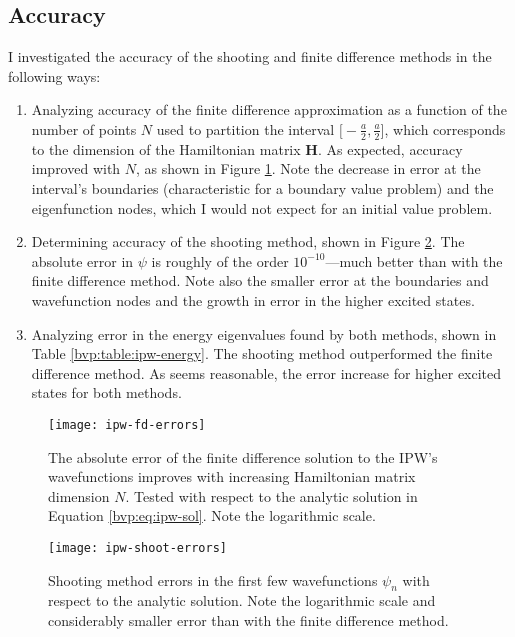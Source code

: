 \documentclass[11pt, a4paper]{article}
\begin{document}
\subsection{Accuracy}
I investigated the accuracy of the shooting and finite difference methods in the following ways:
\begin{enumerate}
	\item Analyzing accuracy of the finite difference approximation as a function of the number of points $ N $ used to partition the interval $ \big[-\frac{a}{2}, \frac{a}{2}\big] $, which corresponds to the dimension of the Hamiltonian matrix $ \mathbf{H} $. As expected, accuracy improved with $ N $, as shown in Figure \ref{bvp:fig:ipw-fd-errors}. Note the decrease in error at the interval's boundaries (characteristic for a boundary value problem) and the eigenfunction nodes, which I would not expect for an initial value problem.
	
	\item Determining accuracy of the shooting method, shown in Figure \ref{bvp:fig:ipw-shoot-errors}. The absolute error in $ \psi $ is roughly of the order  $ 10^{-10} $---much better than with the finite difference method. Note also the smaller error at the boundaries and wavefunction nodes and the growth in error in the higher excited states.
	
	
	\item Analyzing error in the energy eigenvalues found by both methods, shown in Table \ref{bvp:table:ipw-energy}. The shooting method outperformed the finite difference method. As seems reasonable, the error increase for higher excited states for both methods.
\end{enumerate}

\begin{figure}[hbt!]
\centering
\texttt{[image: ipw-fd-errors]}
\caption{The absolute error of the finite difference solution to the IPW's wavefunctions improves with increasing Hamiltonian matrix dimension $ N $. Tested with respect to the analytic solution in Equation \ref{bvp:eq:ipw-sol}. Note the logarithmic scale.}
\label{bvp:fig:ipw-fd-errors}
\end{figure}

\begin{figure}[hbt!]
\centering
\texttt{[image: ipw-shoot-errors]}
\caption{Shooting method errors in the first few wavefunctions $ \psi_{n} $ with respect to the analytic solution. Note the logarithmic scale and considerably smaller error than with the finite difference method.}
\label{bvp:fig:ipw-shoot-errors}
\end{figure}
\end{document}
